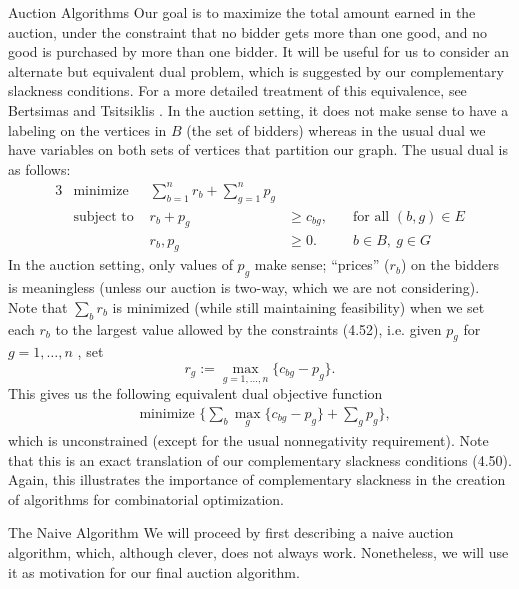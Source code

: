 \begin{section}{Auction Algorithms}
	Our goal is to maximize the total amount earned in the auction, 
	under the constraint that no bidder gets more than one good, 
	and no good is purchased by more than one bidder.
	It will be useful for us to consider an alternate but equivalent dual problem, which is 
	suggested by our complementary slackness conditions. For a more detailed treatment of this 
	equivalence, see Bertsimas and Tsitsiklis \cite{bertsimas1997introduction}. 
	In the auction setting, it does not make 
	sense to have a labeling on the vertices in $B$ (the set of bidders) whereas in the usual dual we 
	have variables on both sets of vertices that partition our graph. The usual dual is as 
	follows:
	\begin{alignat}{3}
		& \text{minimize } & \sum_{b=1}^n r_b + \sum_{g=1}^n p_g & \\
		& \text{subject to } & r_b + p_g & \geq c_{bg}, &\quad \text{for all } (b,g)\in E\\
				     && r_b,p_g & \geq 0. & \quad b\in B,\ g\in G
	\end{alignat}
	In the auction setting, only 
	values of $p_g$ make sense; ``prices'' ($r_b$) on the bidders is meaningless (unless our 
	auction is two-way, which we are not considering). 
	Note that $\sum_b r_b$ is minimized (while still maintaining feasibility) when we set each 
	$r_b$ to the largest value allowed by the constraints (4.52), i.e. given $p_{g}$ for 
	$g=1, \dots, n$ , set
	\[
		r_{g} := \max_{g=1,\dots, n} \{c_{bg} - p_g\}.
	\]
	This gives us the following equivalent dual objective function 
	\begin{align}
		&\text{minimize }\{ \sum_b \max_g \{c_{bg} - p_g\} + \sum_g p_g\},
	\end{align}
	which is unconstrained (except for the usual nonnegativity requirement). 
	Note that this is an exact translation of our complementary slackness 
	conditions (4.50). Again, this illustrates the importance of complementary slackness in the 
	creation of algorithms for combinatorial optimization.

	\begin{subsection}{The Naive Algorithm}
		We will proceed by first describing a naive auction algorithm, which, although clever, 
		does not always work. Nonetheless, we will use it as motivation for 
		our final auction algorithm.


\end{subsection}
\end{section}
